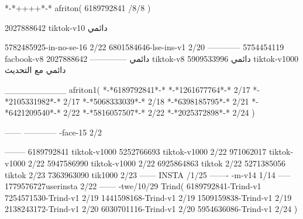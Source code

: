 *-*++++*-*
afriton(
6189792841 /8/8
)

2027888642 tiktok-v10
دائمي

5782485925-in-no-se-16 2/22
6801584646-lse-ins-v1 2/20
------------
5754454119 facbook-v8
دائمي
--------------
2027888642 tiktok-v8
دائمي
5909533996 tiktok-v1000
دائمي مع التحديث

__________
afriton1(
*-*6189792841*-*
*-*1261677764*-* 2/17
*-*2105331982*-* 2/17
*-*5068333039*-* 2/18
*-*6398185795*-* 2/21
*-*6421209540*-* 2/22
*-*5816057507*-* 2/22
*-*2025372898*-* 2/24
)

------
------------
-face-15 2/2

--------
6189792841 tiktok-v1000
5252766693 tiktok-v1000 2/22
971062017 tiktok-v1000 2/22
5947586990 tiktok-v1000 2/22
6925864863 tiktok 2/22
5271385056 tiktok 2/23
7363963090 tik1000 2/23
------
 INSTA /1/25
-------
-m-v14 1/14
-----
1779576727userinsta 2/22
------
-twe/10/29
Trind(
6189792841-Trind-v1 
7254571530-Trind-v1 2/19
1441598168-Trind-v1 2/19
1509159838-Trind-v1 2/19
2138243172-Trind-v1 2/20
6030701116-Trind-v1 2/20
5954636086-Trind-v1 2/24
)
